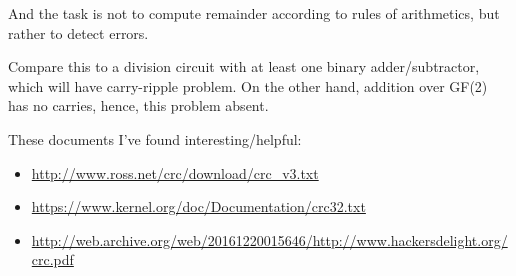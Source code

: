 And the task is not to compute remainder according to rules of arithmetics, but rather to detect errors.

Compare this to a division circuit with at least one binary adder/subtractor, which will have carry-ripple problem.
On the other hand, addition over GF(2) has no carries, hence, this problem absent.


These documents I've found interesting/helpful:

\begin{itemize}

\item \url{http://www.ross.net/crc/download/crc_v3.txt}
\item \url{https://www.kernel.org/doc/Documentation/crc32.txt}
\item \url{http://web.archive.org/web/20161220015646/http://www.hackersdelight.org/crc.pdf}

\end{itemize}

\levelup{}

